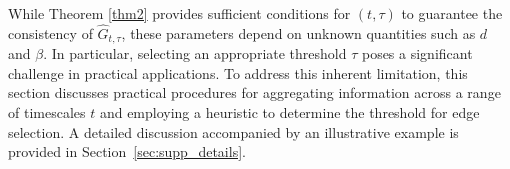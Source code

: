 \documentclass[11pt,a4paper,final]{article}
\numberwithin{equation}{section}
\theoremstyle{remark}
\newcommand{\bff}{{\bf f}}
\newcommand{\bH}{{\bf H}}
\newcommand{\bU}{{\bf U}}
\newcommand{\bX}{{\bf X}}
\newcommand{\bZ}{{\bf Z}}
\newcommand{\bbE}{{\mathbb E}}
\begin{document}



While Theorem \ref{thm2} provides sufficient conditions for $(t, \tau)$ to guarantee the consistency of $\widehat G_{t, \tau}$, these parameters depend on unknown quantities such as $d$ and $\beta$. In particular, selecting an appropriate threshold $\tau$ poses a significant challenge in practical applications. To address this inherent limitation, this section discusses practical procedures for aggregating information across a range of timescales $t$ and employing a heuristic to determine the threshold for edge selection. A detailed discussion accompanied by an illustrative example is provided in Section~\ref{sec:supp_details}.
\end{document}
